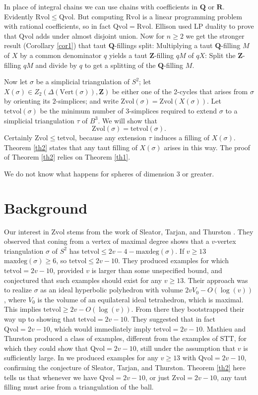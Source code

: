 \documentclass[12pt]{article}
\def\ZZ{\mathbf{Z}}
\def\QQ{\mathbf{Q}}
\def\RR{\mathbf{R}}
\newcommand{\kw}{\mathrm}
\newcommand{\maxdeg}{\kw{maxdeg}}
\newcommand{\vertices}{\kw{Vert}}
\newcommand{\Zvol}{\kw{Zvol}}
\newcommand{\Qvol}{\kw{Qvol}}
\newcommand{\Rvol}{\kw{Rvol}}
\newcommand{\tetvol}{\kw{tetvol}}
\begin{document}
In place of integral chains we can use chains with
coefficients in $\QQ$ or $\RR$.
Evidently $\Rvol \leq \Qvol$.
But computing $\Rvol$ is
a linear programming problem with rational coefficients,
so in fact $\Qvol = \Rvol$.
Ellison used LP duality to prove that
$\Qvol$ adds under almost
disjoint union.
Now for $n \geq 2$ we get the stronger result
(Corollary \ref{cor1})
that taut $\QQ$-fillings split:
Multiplying a taut
$\QQ$-filling $M$ of $X$ by a common denominator $q$
yields a taut $\ZZ$-filling $qM$ of $qX$:
Split the $\ZZ$-filling $qM$ and divide by $q$ to get a splitting
of the $\QQ$-filling $M$.

Now let $\sigma$ be a simplicial triangulation of $S^2$;
let $X(\sigma) \in Z_2(\Delta(\vertices(\sigma)),\ZZ)$
be either one of the 2-cycles
that arises from $\sigma$ by orienting its $2$-simplices;
and write $\Zvol(\sigma) = \Zvol(X(\sigma))$.
Let $\tetvol(\sigma)$ be the minimum number of $3$-simplices
required to extend $\sigma$ to a simplicial triangulation $\tau$ of $B^3$.
We will show that
\[
\Zvol(\sigma) = \tetvol(\sigma)
.
\]
Certainly $\Zvol \leq \tetvol$,
because any extension $\tau$ induces a filling
of $X(\sigma)$.
Theorem \ref{th2} states that 
any taut filling of $X(\sigma)$ arises in this way.
The proof of Theorem \ref{th2} relies on Theorem \ref{th1}.

We do not know what happens for spheres of dimension 3 or greater.

\section{Background}

Our interest in $\Zvol$ stems from the work
of Sleator, Tarjan, and Thurston
\cite{stt:jams}.
They observed that coning from a vertex of maximal degree
shows that a $v$-vertex
triangulation $\sigma$
of $S^2$ has $\tetvol \leq 2v-4-\maxdeg(\sigma)$.
If $v\geq13$ $\maxdeg(\sigma) \geq 6$, so $\tetvol \leq 2v-10$.
They
produced examples for which $\tetvol = 2v-10$, provided
$v$ is larger than some unspecified bound,
and conjectured that such examples should exist for any $v \geq 13$.
Their approach was to 
realize $\sigma$ as an ideal hyperbolic polyhedron
with volume $2v V_0-O(\log(v))$,
where $V_0$ is the volume of an
equilateral ideal tetrahedron,
which is maximal.
This implies $\tetvol \geq 2v-O(\log(v))$.
From there they bootstrapped their way up to showing
that $\tetvol=2v-10$.
They suggested
\cite[p. 697]{stt:jams}
that in fact $\Qvol= 2v-10$,
which would immediately imply $\tetvol=2v-10$.
Mathieu and Thurston \cite{mt}
produced a class of examples,
different from the examples of STT,
for which they could show that $\Qvol = 2v-10$,
still under the assumption that $v$
is sufficiently large.
In \cite{dew:filling} we produced examples for any $v \geq 13$ with
$\Qvol=2v-10$, confirming the conjecture of Sleator, Tarjan, and Thurston.
Theorem \ref{th2} here
tells us that whenever we have $\Qvol=2v-10$,
or just $\Zvol=2v-10$, any taut filling
must arise from a triangulation of the ball.
\end{document}
